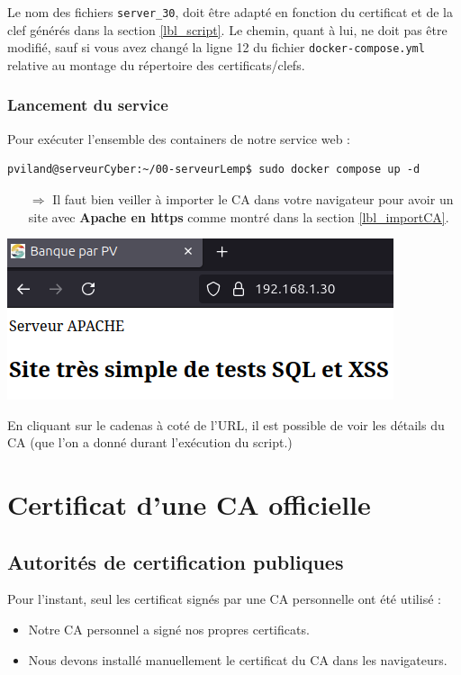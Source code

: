 \documentclass[french, 12pt]{article}%
\newcommand{\itemE}{\item[$\bullet$]}
\begin{document}
Le nom des fichiers \verb?server_30?, doit être adapté en fonction du certificat et de la clef générés dans la section \ref{lbl_script}. Le chemin, quant à lui, ne doit pas être modifié, sauf si vous avez changé la ligne 12 du fichier \verb?docker-compose.yml? relative au montage du répertoire des certificats/clefs.


\subsubsection{Lancement du service}

Pour exécuter l'ensemble des containers de notre service web : 
\begin{lstlisting}[style=commande]
pviland@serveurCyber:~/00-serveurLemp$ sudo docker compose up -d
\end{lstlisting}


\begin{itemize}
\item[$\Rightarrow$] Il faut bien veiller à importer le CA dans votre navigateur pour avoir un site avec \textbf{Apache en https} comme montré dans la section \ref{lbl_importCA}.
\end{itemize}


\begin{center}
\includegraphics[scale=0.7]{./ressource/apacheHttps}
\end{center}

En cliquant sur le cadenas à coté de l'URL, il est possible de voir les détails du CA (que l'on a donné durant l'exécution du script.)



\section{Certificat d'une CA officielle}

\subsection{Autorités de certification publiques }
Pour l'instant, seul les certificat signés par une CA personnelle ont été utilisé : 
\begin{itemize}
\itemE Notre CA personnel a signé nos propres certificats. 
\itemE Nous devons installé manuellement le certificat du CA dans les navigateurs.
\end{itemize} 
\end{document}
